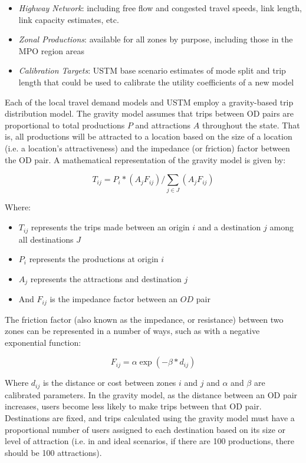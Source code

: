 \begin{itemize}
\def\labelenumi{\arabic{enumi}.}
\item
  \emph{Highway Network}: including free flow and congested travel speeds,
  link length, link capacity estimates, etc.
\item
  \emph{Zonal Productions}: available for all zones by purpose,
  including those in the MPO region areas
\item
  \emph{Calibration Targets}: USTM base scenario estimates of mode split and
  trip length that could be used to calibrate the utility coefficients of a new model
\end{itemize}

Each of the local travel demand models and USTM employ a gravity-based trip
distribution model. The gravity model assumes that trips between OD
pairs are proportional to total productions $P$ and
attractions $A$ throughout the state. That is, all productions will be
attracted to a location based on the size of a location (i.e. a location's
attractiveness) and the impedance (or friction) factor between the OD
pair. A mathematical representation of the gravity model is given by:

\begin{equation}
T_{ij}= P_i*(A_j F_{ij})/\sum_{j\in J}(A_j F_{ij})
 \label{eqn:gravity}
\end{equation}

\noindent Where:
\begin{itemize}
	\item $T_{ij}$ represents the trips made between an origin $i$ and a
  destination $j$ among all destinations $J$
	\item $P_i$ represents the productions at origin $i$
	\item $A_j$ represents the attractions and destination $j$
	\item And $F_{ij}$ is the impedance factor between an $OD$ pair
\end{itemize}

The friction factor (also known as the impedance, or resistance) between two
zones can be represented in a number of ways, such as with a negative
exponential function:

\begin{equation}
	F_{ij} = \alpha \exp(-\beta * d_{ij})
  \label{eqn:fricfac}
\end{equation}

\noindent Where $d_{ij}$ is the distance or cost between zones $i$ and $j$ and $\alpha$
and $\beta$ are calibrated parameters. In the gravity model, as the distance
between an OD pair increases, users become less likely to make trips between
that OD pair. Destinations are fixed, and trips calculated using the
gravity model must have a proportional number of users assigned to each
destination based on its size or level of attraction (i.e. in and ideal
scenarios, if there are 100
productions, there should be 100 attractions).


